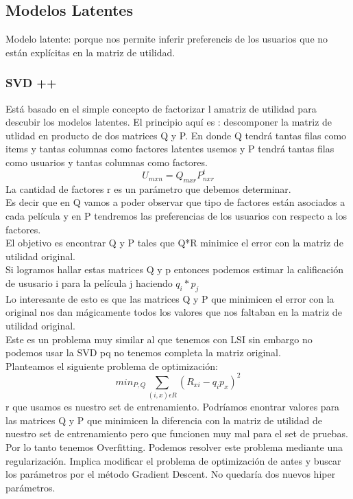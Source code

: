 \documentclass[titlepage,a4paper]{article}
\begin{document}
\subsection*{Modelos Latentes}
Modelo latente: porque nos permite inferir preferencis de los usuarios que no están explícitas en la matriz de utilidad. \\

\subsubsection*{SVD ++}
Está basado en el simple concepto de factorizar l amatriz de utilidad para descubir los modelos latentes. El principio aquí es : descomponer la matriz de utlidad en producto de dos matrices Q y P. En donde Q tendrá tantas filas como items y tantas columnas como factores latentes usemos y P tendrá tantas filas como usuarios y tantas columnas como factores. $$U_{mxn} = Q_{mxr}P^t_{nxr}$$
La cantidad de factores r es un parámetro que debemos determinar. \\

Es decir que en Q vamos a poder observar que tipo de factores están asociados a cada película y en P tendremos las preferencias de los usuarios con respecto a los factores. \\

El objetivo es encontrar Q y P tales que Q*R minimice el error con la matriz de utilidad original. \\

Si logramos hallar estas matrices Q y p entonces podemos estimar la calificación de ususario i para la película j haciendo $q_i * p_j$\\

Lo interesante de esto es que las matrices Q y P que minimicen el error con la original nos dan mágicamente todos los valores que nos faltaban en la matriz de utilidad original. \\

Este es un problema muy similar al que tenemos con LSI sin embargo no podemos usar la SVD pq no tenemos completa la matriz original. \\

Planteamos el siguiente problema de optimización: $$min_{P,Q}\sum_{(i,x)\epsilon R} (R_{xi}-q_ip_x)^2 $$
r que usamos es nuestro set de entrenamiento. Podríamos enontrar valores para las matrices Q y P que minimicen la diferencia con la matriz de utilidad de nuestro set de entrenamiento pero que funcionen muy mal para el set de pruebas. Por lo tanto tenemos Overfitting. Podemos resolver este problema mediante una regularización. Implica modificar el problema de optimización de antes y buscar los parámetros por el método Gradient Descent. No quedaría dos nuevos hiper parámetros. \\
\end{document}
